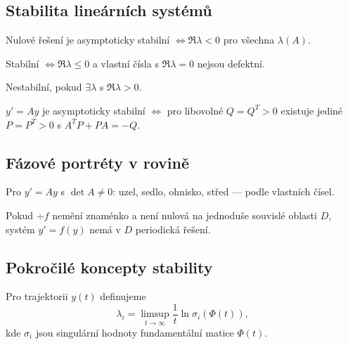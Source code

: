 \spc

\subsection{Stabilita lineárních systémů}
\label{sec:stabilita-linearnich}

\begin{theorem}[Lineární systémy $y'=Ay$]
\label{vet:linearni-stabilita}
\begin{romanenum}
\item Nulové řešení je asymptoticky stabilní $\iff \Re\lambda<0$ pro všechna $\lambda(A)$.
\item Stabilní $\iff \Re\lambda\le 0$ a vlastní čísla s $\Re\lambda=0$ nejsou defektní.
\item Nestabilní, pokud $\exists \lambda$ s $\Re\lambda>0$.
\end{romanenum}
\end{theorem}

\begin{theorem}
\label{vet:ljapunovova-rovnice}
$y'=Ay$ je asymptoticky stabilní $\iff$ pro libovolné $Q=Q^T>0$ existuje jediné $P=P^T>0$ s $A^TP+PA=-Q$.
\end{theorem}

\spc

\subsection{Fázové portréty v rovině}
\label{sec:fazove-portrety}

\begin{definition}
\label{def:klasifikace-2d}
Pro $y'=Ay$ s $\det A\neq 0$: uzel, sedlo, ohnisko, střed — podle vlastních čísel.
\end{definition}

\begin{theorem}
\label{vet:bendixson}
Pokud $\div f$ nemění znaménko a není nulová na jednoduše souvislé oblasti $D$, systém $y'=f(y)$ nemá v $D$ periodická řešení.
\end{theorem}

\spc

\subsection{Pokročilé koncepty stability}
\label{sec:pokrocile-stabilita}

\begin{definition}
\label{def:lyap-exponenty}
Pro trajektorii $y(t)$ definujeme
\[
\lambda_i=\limsup_{t\to\infty}\frac1t\ln\sigma_i(\Phi(t)),
\]
kde $\sigma_i$ jsou singulární hodnoty fundamentální matice $\Phi(t)$.
\end{definition}

